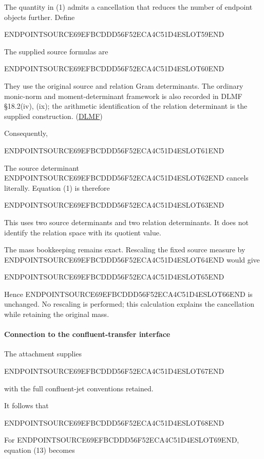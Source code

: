 The quantity in (1) admits a cancellation that reduces the number of endpoint objects further. Define

ENDPOINTSOURCE69EFBCDDD56F52ECA4C51D4ESLOT59END

The supplied source formulas are

ENDPOINTSOURCE69EFBCDDD56F52ECA4C51D4ESLOT60END

They use the original source and relation Gram determinants. The ordinary monic-norm and moment-determinant framework is also recorded in DLMF §18.2(iv), (ix); the arithmetic identification of the relation determinant is the supplied construction. (\href{https://dlmf.nist.gov/18.2?utm_source=chatgpt.com}{DLMF})

Consequently,

ENDPOINTSOURCE69EFBCDDD56F52ECA4C51D4ESLOT61END

The source determinant ENDPOINTSOURCE69EFBCDDD56F52ECA4C51D4ESLOT62END cancels literally. Equation (1) is therefore

ENDPOINTSOURCE69EFBCDDD56F52ECA4C51D4ESLOT63END

This uses two source determinants and two relation determinants. It does not identify the relation space with its quotient value.

The mass bookkeeping remains exact. Rescaling the fixed source measure by ENDPOINTSOURCE69EFBCDDD56F52ECA4C51D4ESLOT64END would give

ENDPOINTSOURCE69EFBCDDD56F52ECA4C51D4ESLOT65END

Hence ENDPOINTSOURCE69EFBCDDD56F52ECA4C51D4ESLOT66END is unchanged. No rescaling is performed; this calculation explains the cancellation while retaining the original mass.

\paragraph{Connection to the confluent-transfer interface}\label{endpoint-user_product_original--connection-to-the-confluent-transfer-interface}

The attachment supplies

ENDPOINTSOURCE69EFBCDDD56F52ECA4C51D4ESLOT67END

with the full confluent-jet conventions retained.

It follows that

ENDPOINTSOURCE69EFBCDDD56F52ECA4C51D4ESLOT68END

For ENDPOINTSOURCE69EFBCDDD56F52ECA4C51D4ESLOT69END, equation (13) becomes

